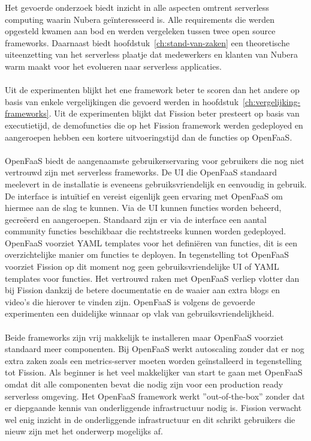 Het gevoerde onderzoek biedt inzicht in alle aspecten omtrent serverless computing waarin Nubera geïnteresseerd is. Alle requirements die werden opgesteld kwamen aan bod en werden vergeleken tussen twee open source frameworks. Daarnaast biedt hoofdstuk~\ref{ch:stand-van-zaken} een theoretische uiteenzetting van het serverless plaatje dat medewerkers en klanten van Nubera warm maakt voor het evolueren naar serverless applicaties.
\\\\
Uit de experimenten blijkt het ene framework beter te scoren dan het andere op basis van enkele vergelijkingen die gevoerd werden in hoofdstuk~\ref{ch:vergelijking-frameworks}. Uit de experimenten blijkt dat Fission beter presteert op basis van executietijd, de demofuncties die op het Fission framework werden gedeployed en aangeroepen hebben een kortere uitvoeringstijd dan de functies op OpenFaaS.
\\\\
OpenFaaS biedt de aangenaamste gebruikerservaring voor gebruikers die nog niet vertrouwd zijn met serverless frameworks. De UI die OpenFaaS standaard meelevert in de installatie is eveneens gebruiksvriendelijk en eenvoudig in gebruik. De interface is intuïtief en vereist eigenlijk geen ervaring met OpenFaaS om hiermee aan de slag te kunnen. Via de UI kunnen functies worden beheerd, gecreëerd en aangeroepen. Standaard zijn er via de interface een aantal community functies beschikbaar die rechtstreeks kunnen worden gedeployed. OpenFaaS voorziet YAML templates voor het definiëren van functies, dit is een overzichtelijke manier om functies te deployen. In tegenstelling tot OpenFaaS voorziet Fission op dit moment nog geen gebruiksvriendelijke UI of YAML templates voor functies. Het vertrouwd raken met OpenFaaS verliep vlotter dan bij Fission dankzij de betere documentatie en de waaier aan extra blogs en video's die hierover te vinden zijn. OpenFaaS is volgens de gevoerde experimenten een duidelijke winnaar op vlak van gebruiksvriendelijkheid. 
\\\\
Beide frameworks zijn vrij makkelijk te installeren maar OpenFaaS voorziet standaard meer componenten. Bij OpenFaaS werkt autoscaling zonder dat er nog extra zaken zoals een metrics-server moeten worden geïnstalleerd in tegenstelling tot Fission. Als beginner is het veel makkelijker van start te gaan met OpenFaaS omdat dit alle componenten bevat die nodig zijn voor een production ready serverless omgeving. Het OpenFaaS framework werkt ''out-of-the-box'' zonder dat er diepgaande kennis van onderliggende infrastructuur nodig is. Fission verwacht wel enig inzicht in de onderliggende infrastructuur en dit schrikt gebruikers die nieuw zijn met het onderwerp mogelijks af.
